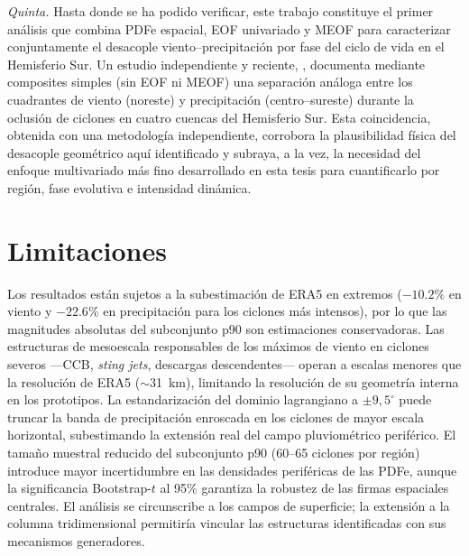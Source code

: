 \textit{Quinta.} Hasta donde se ha podido verificar, este trabajo constituye el primer análisis que combina PDFe espacial, EOF univariado y MEOF para caracterizar conjuntamente el desacople viento--precipitación por fase del ciclo de vida en el Hemisferio Sur. Un estudio independiente y reciente, \citet{ribeiro2025impacts}, documenta mediante composites simples (sin EOF ni MEOF) una separación análoga entre los cuadrantes de viento (noreste) y precipitación (centro--sureste) durante la oclusión de ciclones en cuatro cuencas del Hemisferio Sur. Esta coincidencia, obtenida con una metodología independiente, corrobora la plausibilidad física del desacople geométrico aquí identificado y subraya, a la vez, la necesidad del enfoque multivariado más fino desarrollado en esta tesis para cuantificarlo por región, fase evolutiva e intensidad dinámica.


\section{Limitaciones}

Los resultados están sujetos a la subestimación de ERA5 en extremos ($-10.2\%$ en viento y $-22.6\%$ en precipitación para los ciclones más intensos), por lo que las magnitudes absolutas del subconjunto p90 son estimaciones conservadoras. Las estructuras de mesoescala responsables de los máximos de viento en ciclones severos ---CCB, \textit{sting jets}, descargas descendentes--- operan a escalas menores que la resolución de ERA5 ($\sim$31~km), limitando la resolución de su geometría interna en los prototipos. La estandarización del dominio lagrangiano a $\pm 9{,}5^{\circ}$ puede truncar la banda de precipitación enroscada en los ciclones de mayor escala horizontal, subestimando la extensión real del campo pluviométrico periférico. El tamaño muestral reducido del subconjunto p90 (60--65 ciclones por región) introduce mayor incertidumbre en las densidades periféricas de las PDFe, aunque la significancia Bootstrap-$t$ al 95\% garantiza la robustez de las firmas espaciales centrales. El análisis se circunscribe a los campos de superficie; la extensión a la columna tridimensional permitiría vincular las estructuras identificadas con sus mecanismos generadores.


